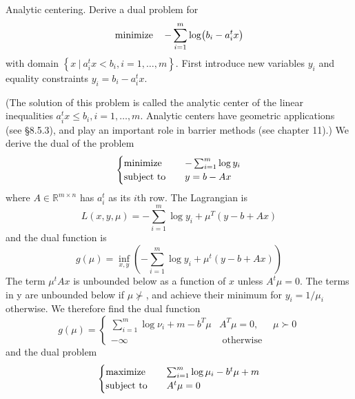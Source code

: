 \begin{problem}[5.12]
    Analytic centering. Derive a dual problem for\[\operatorname{minimize} \quad -\sum_{i = 1}^m \log(b_i - a_i^tx)\] with domain $\left\{x\ |\ a_i^tx < b_i, i = 1, \dots, m\right\}$. First introduce new variables $y_i$ and equality constraints $y_i = b_i - a_i^tx$.

    (The solution of this problem is called the analytic center of the linear inequalities $a_i^tx \le b_i, i = 1, \dots, m$. Analytic centers have geometric applications (see \S8.5.3), and play an important role in barrier methods (see chapter 11).)
    \Answer We derive the dual of the problem\[\begin{cases}
        \operatorname{minimize} \quad &-\sum_{i = 1}^m\log y_i\\
        \operatorname{subject\ to} \quad &y = b - Ax
    \end{cases}\]where $A \in \mathbb{R}^{m \times n}$ has $a_i^t$ as its $i$th row. The Lagrangian is\[L(x, y, \mu)=-\sum_{i=1}^{m} \log y_{i}+\mu^{T}(y-b+A x)\] and the dual function is \[g(\mu) = \inf_{x, y}\left(-\sum_{i = 1}^m\log y_i + \mu^t(y - b + Ax)\right)\] The term $\mu^tAx$ is unbounded below as a function of $x$ unless $A^t\mu = 0$. The terms in y are unbounded below if $\mu \nsucc$, and achieve their minimum for $y_i = 1 / \mu_i$ otherwise. We therefore find the dual function\[g(\mu)=\left\{\begin{array}{lll}
        \sum_{i=1}^{m} \log \nu_{i}+m-b^{T} \mu & A^{T} \mu=0, & \mu \succ 0 \\
        -\infty & \text { otherwise } &
        \end{array}\right.\] and the dual problem \[\begin{cases}
            \operatorname{maximize} \quad &\sum_{i = 1}^m\log \mu_i - b^t\mu + m\\
            \operatorname{subject\ to} \quad &A^t\mu = 0
        \end{cases}\]
\end{problem}

